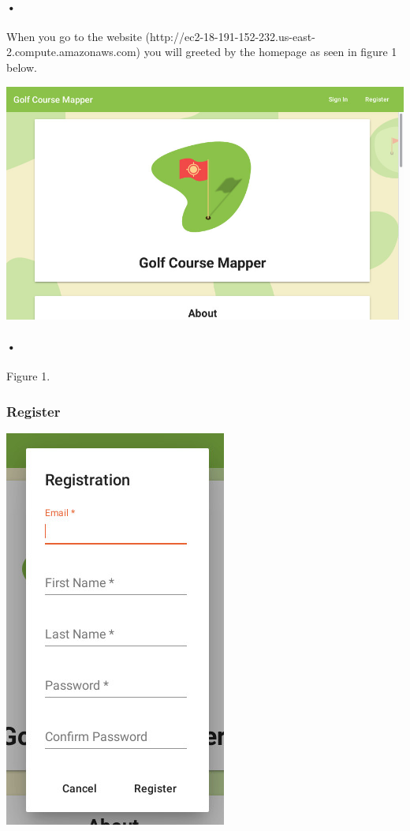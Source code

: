 \documentclass{article}
\begin{document}
	\paragraph{•}
	When you go to the website (http://ec2-18-191-152-232.us-east-2.compute.amazonaws.com) 			     you will greeted by the homepage as seen in figure 1 below.	
	
	
	\includegraphics[scale=1.2]{0_home}
	\paragraph{•}
    Figure 1.
	
	
	\subsubsection{Register}
	\includegraphics[scale=1.5]{1_register}
\end{document}
